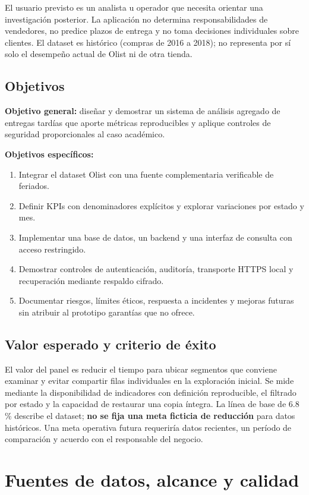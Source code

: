 \documentclass[12pt,a4paper]{article}
\begin{document}
El usuario previsto es un analista u operador que necesita orientar una investigación posterior. La aplicación no determina responsabilidades de vendedores, no predice plazos de entrega y no toma decisiones individuales sobre clientes. El dataset es histórico (compras de 2016 a 2018); no representa por sí solo el desempeño actual de Olist ni de otra tienda.

\subsection{Objetivos}
\textbf{Objetivo general:} diseñar y demostrar un sistema de análisis agregado de entregas tardías que aporte métricas reproducibles y aplique controles de seguridad proporcionales al caso académico.

\textbf{Objetivos específicos:}
\begin{enumerate}
\item Integrar el dataset Olist con una fuente complementaria verificable de feriados.
\item Definir KPIs con denominadores explícitos y explorar variaciones por estado y mes.
\item Implementar una base de datos, un backend y una interfaz de consulta con acceso restringido.
\item Demostrar controles de autenticación, auditoría, transporte HTTPS local y recuperación mediante respaldo cifrado.
\item Documentar riesgos, límites éticos, respuesta a incidentes y mejoras futuras sin atribuir al prototipo garantías que no ofrece.
\end{enumerate}

\subsection{Valor esperado y criterio de éxito}
El valor del panel es reducir el tiempo para ubicar segmentos que conviene examinar y evitar compartir filas individuales en la exploración inicial. Se mide mediante la disponibilidad de indicadores con definición reproducible, el filtrado por estado y la capacidad de restaurar una copia íntegra. La línea de base de 6.8\,\% describe el dataset; \textbf{no se fija una meta ficticia de reducción} para datos históricos. Una meta operativa futura requeriría datos recientes, un período de comparación y acuerdo con el responsable del negocio.

\section{Fuentes de datos, alcance y calidad}
\end{document}
